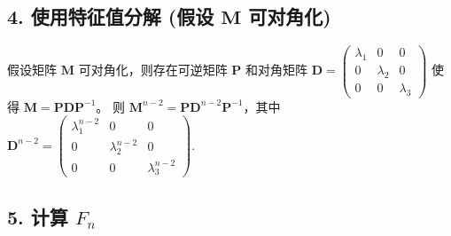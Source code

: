 \documentclass{article}
\begin{document}
\subsection*{4. 使用特征值分解 (假设 $\mathbf{M}$ 可对角化)}

假设矩阵 $\mathbf{M}$ 可对角化，则存在可逆矩阵 $\mathbf{P}$ 和对角矩阵 $\mathbf{D} = \begin{pmatrix} \lambda_1 & 0 & 0 \\ 0 & \lambda_2 & 0 \\ 0 & 0 & \lambda_3 \end{pmatrix}$ 使得 $\mathbf{M} = \mathbf{P} \mathbf{D} \mathbf{P}^{-1}$。
则 $\mathbf{M}^{n-2} = \mathbf{P} \mathbf{D}^{n-2} \mathbf{P}^{-1}$，其中 $\mathbf{D}^{n-2} = \begin{pmatrix} \lambda_1^{n-2} & 0 & 0 \\ 0 & \lambda_2^{n-2} & 0 \\ 0 & 0 & \lambda_3^{n-2} \end{pmatrix}$.

\subsection*{5. 计算 $F_n$}
\end{document}

